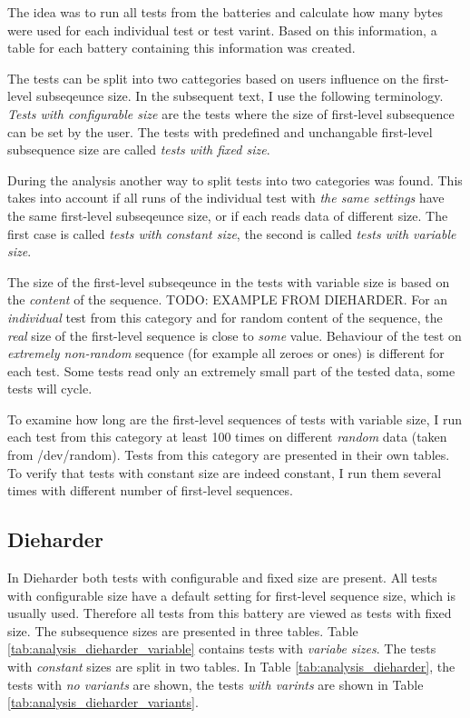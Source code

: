 \documentclass[
  digital,     %
  oneside,     %
  nosansbold,  %
  nocolorbold, %
  nolof,         %
  nolot,         %
]{fithesis4}
\begin{document}
The idea was to run all tests from the batteries and calculate how many bytes were used for each individual test or test varint. Based on this information, a table for each battery containing this information was created.

The tests can be split into two cattegories based on users influence on the first-level subseqeunce size. In the subsequent text, I use the following terminology. \emph{Tests with configurable size} are the tests where the size of first-level subsequence can be set by the user. The tests with predefined and unchangable first-level subsequence size are called \emph{tests with fixed size}.

During the analysis another way to split tests into two categories was found. This takes into account if all runs of the individual test with \emph{the same settings} have the same first-level subseqeunce size, or if each reads data of different size. The first case is called \emph{tests with constant size}, the second is called \emph{tests with variable size}. 

The size of the first-level subseqeunce in the tests with variable size is based on the \emph{content} of the sequence. TODO: EXAMPLE FROM DIEHARDER. For an \emph{individual} test from this category and for random content of the sequence, the \emph{real} size of the first-level sequence is close to \emph{some} value. Behaviour of the test on \emph{extremely non-random} sequence (for example all zeroes or ones) is different for each test. Some tests read only an extremely small part of the tested data, some tests will cycle.

To examine how long are the first-level sequences of tests with variable size, I run each test from this category at least 100 times on different \emph{random} data (taken from /dev/random). Tests from this category are presented in their own tables. To verify that tests with constant size are indeed constant, I run them several times with different number of first-level sequences.

\subsection{Dieharder}

In Dieharder both tests with configurable and fixed size are present. All tests with configurable size have a default setting for first-level sequence size, which is usually used. Therefore all tests from this battery are viewed as tests with fixed size. The subsequence sizes are presented in three tables. Table \ref{tab:analysis_dieharder_variable} contains tests with \emph{variabe sizes}. The tests with \emph{constant} sizes are split in two tables. In Table \ref{tab:analysis_dieharder}, the tests with \emph{no variants} are shown, the tests \emph{with varints} are shown in Table \ref{tab:analysis_dieharder_variants}.
\end{document}
